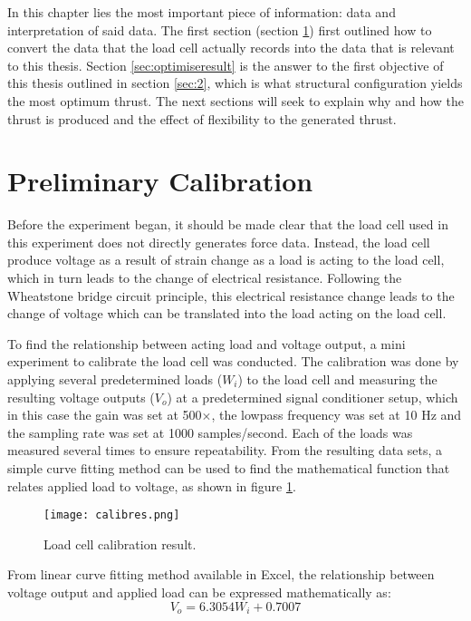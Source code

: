 In this chapter lies the most important piece of information: data and interpretation of said data. The first section (section \ref{sec:calib}) first outlined how to convert the data that the load cell actually records into the data that is relevant to this thesis. Section \ref{sec:optimiseresult} is the answer to the first objective of this thesis outlined in section \ref{sec:2}, which is what structural configuration yields the most optimum thrust. The next sections will seek to explain why and how the thrust is produced and the effect of flexibility to the generated thrust.\par
\section{Preliminary Calibration}
\label{sec:calib}
Before the experiment began, it should be made clear that the load cell used in this experiment does not directly generates force data. Instead, the load cell produce voltage as a result of strain change as a load is acting to the load cell, which in turn leads to the change of electrical resistance. Following the Wheatstone bridge circuit principle, this electrical resistance change leads to the change of voltage which can be translated into the load acting on the load cell.\par
To find the relationship between acting load and voltage output, a mini experiment to calibrate the load cell was conducted. The calibration was done by applying several predetermined loads ($W_{i}$) to the load cell and measuring the resulting voltage outputs ($V_{o}$) at a predetermined signal conditioner setup, which in this case the gain was set at 500$\times$, the lowpass frequency was set at 10 Hz and the sampling rate was set at 1000 samples/second. Each of the loads was measured several times to ensure repeatability. From the resulting data sets, a simple curve fitting method can be used to find the mathematical function that relates applied load to voltage, as shown in figure \ref{fig:calibres}.
\begin{figure}[H]
    \centering
    \texttt{[image: calibres.png]}
    \caption{Load cell calibration result.}
    \label{fig:calibres}
\end{figure}
From linear curve fitting method available in Excel, the relationship between voltage output and applied load can be expressed mathematically as:
\begin{equation}
    V_{o} = 6.3054W_{i} + 0.7007
    \label{eq:calibres}
\end{equation}
